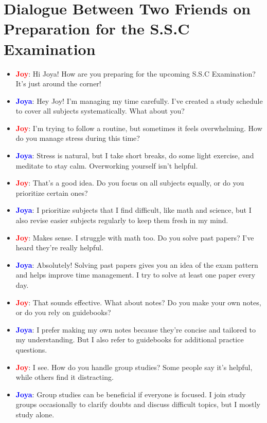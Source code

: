 \documentclass{article}
\begin{document}
\section*{Dialogue Between Two Friends on Preparation for the S.S.C Examination}
\begin{itemize}
    \item \textbf{\textcolor{red}{Joy}}: Hi Joya! How are you preparing for the upcoming S.S.C Examination? It’s just around the corner!
    \item \textbf{\textcolor{blue}{Joya}}: Hey Joy! I’m managing my time carefully. I’ve created a study schedule to cover all subjects systematically. What about you?
    \item \textbf{\textcolor{red}{Joy}}: I’m trying to follow a routine, but sometimes it feels overwhelming. How do you manage stress during this time?
    \item \textbf{\textcolor{blue}{Joya}}: Stress is natural, but I take short breaks, do some light exercise, and meditate to stay calm. Overworking yourself isn’t helpful.
    \item \textbf{\textcolor{red}{Joy}}: That’s a good idea. Do you focus on all subjects equally, or do you prioritize certain ones?
    \item \textbf{\textcolor{blue}{Joya}}: I prioritize subjects that I find difficult, like math and science, but I also revise easier subjects regularly to keep them fresh in my mind.
    \item \textbf{\textcolor{red}{Joy}}: Makes sense. I struggle with math too. Do you solve past papers? I’ve heard they’re really helpful.
    \item \textbf{\textcolor{blue}{Joya}}: Absolutely! Solving past papers gives you an idea of the exam pattern and helps improve time management. I try to solve at least one paper every day.
    \item \textbf{\textcolor{red}{Joy}}: That sounds effective. What about notes? Do you make your own notes, or do you rely on guidebooks?
    \item \textbf{\textcolor{blue}{Joya}}: I prefer making my own notes because they’re concise and tailored to my understanding. But I also refer to guidebooks for additional practice questions.
    \item \textbf{\textcolor{red}{Joy}}: I see. How do you handle group studies? Some people say it’s helpful, while others find it distracting.
    \item \textbf{\textcolor{blue}{Joya}}: Group studies can be beneficial if everyone is focused. I join study groups occasionally to clarify doubts and discuss difficult topics, but I mostly study alone.

\end{itemize}
\end{document}
